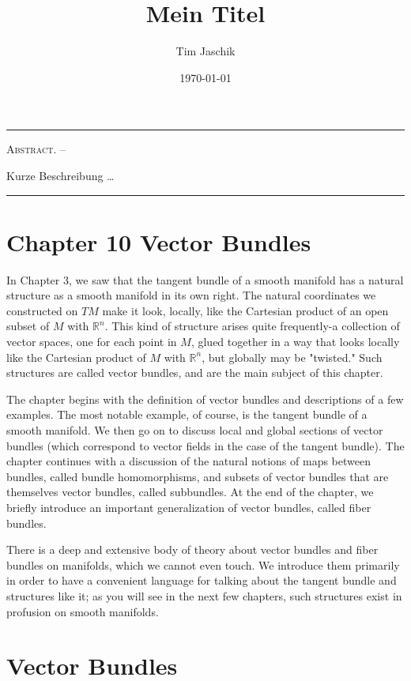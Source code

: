 \documentclass[10pt, letterpaper]{article}
\title{Mein Titel}
\author{Tim Jaschik}
\date{\today}
\renewenvironment{abstract}
  {
    \begin{adjustwidth}{1.5cm}{1.5cm}
    \small
    \textsc{Abstract. –}%
  }
  {
    \end{adjustwidth}
  }
\begin{document}
\maketitle
\rule{\textwidth}{0.5pt}
\begin{abstract}
Kurze Beschreibung …
\end{abstract}
\rule{\textwidth}{0.5pt}
\vspace{0.5cm}

\tableofcontents

\pagebreak



\section*{Chapter 10 Vector Bundles}


In Chapter 3, we saw that the tangent bundle of a smooth manifold has a natural structure as a smooth manifold in its own right. The natural coordinates we constructed on $T M$ make it look, locally, like the Cartesian product of an open subset of $M$ with $\mathbb{R}^{n}$. This kind of structure arises quite frequently-a collection of vector spaces, one for each point in $M$, glued together in a way that looks locally like the Cartesian product of $M$ with $\mathbb{R}^{n}$, but globally may be "twisted." Such structures are called vector bundles, and are the main subject of this chapter.

The chapter begins with the definition of vector bundles and descriptions of a few examples. The most notable example, of course, is the tangent bundle of a smooth manifold. We then go on to discuss local and global sections of vector bundles (which correspond to vector fields in the case of the tangent bundle). The chapter continues with a discussion of the natural notions of maps between bundles, called bundle homomorphisms, and subsets of vector bundles that are themselves vector bundles, called subbundles. At the end of the chapter, we briefly introduce an important generalization of vector bundles, called fiber bundles.

There is a deep and extensive body of theory about vector bundles and fiber bundles on manifolds, which we cannot even touch. We introduce them primarily in order to have a convenient language for talking about the tangent bundle and structures like it; as you will see in the next few chapters, such structures exist in profusion on smooth manifolds.

\section*{Vector Bundles}
\end{document}
